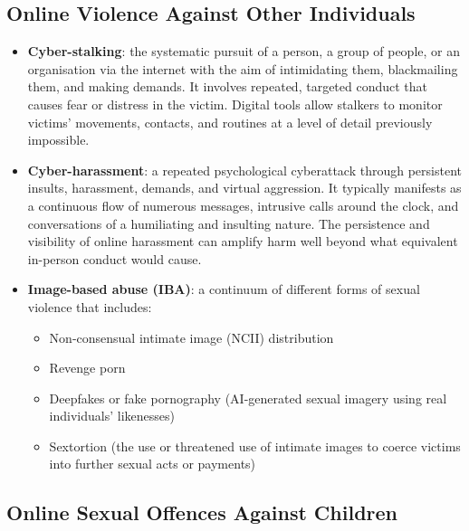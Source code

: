 \documentclass[11pt,a4paper,openany]{report}
\theoremstyle{definition}
\theoremstyle{plain}
\theoremstyle{remark}
\begin{document}
\subsection{Online Violence Against Other Individuals}

\begin{itemize}
    \item \textbf{Cyber-stalking}: the systematic pursuit of a person, a group of people, or an organisation via the internet with the aim of intimidating them, blackmailing them, and making demands. It involves repeated, targeted conduct that causes fear or distress in the victim. Digital tools allow stalkers to monitor victims' movements, contacts, and routines at a level of detail previously impossible.

    \item \textbf{Cyber-harassment}: a repeated psychological cyberattack through persistent insults, harassment, demands, and virtual aggression. It typically manifests as a continuous flow of numerous messages, intrusive calls around the clock, and conversations of a humiliating and insulting nature. The persistence and visibility of online harassment can amplify harm well beyond what equivalent in-person conduct would cause.

    \item \textbf{Image-based abuse (IBA)}: a continuum of different forms of sexual violence that includes:
    \begin{itemize}
        \item Non-consensual intimate image (NCII) distribution
        \item Revenge porn
        \item Deepfakes or fake pornography (AI-generated sexual imagery using real individuals' likenesses)
        \item Sextortion (the use or threatened use of intimate images to coerce victims into further sexual acts or payments)
    \end{itemize}
\end{itemize}

\subsection{Online Sexual Offences Against Children}
\end{document}
